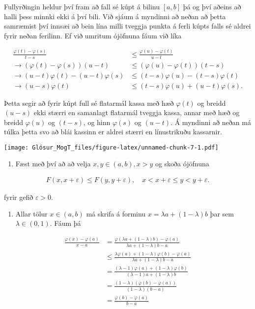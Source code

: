 \documentclass[]{book}
\providecommand{\tightlist}{%
  \setlength{\itemsep}{0pt}\setlength{\parskip}{0pt}}
\begin{document}
Fullyrðingin heldur því fram að fall sé kúpt á bilinu \([a,b]\) þá og því aðeins að halli þess minnki ekki á því bili. Við sjáum á myndinni að neðan að þetta samræmist því innsæi að bein lína milli tveggja punkta á ferli kúpts falls sé aldrei fyrir neðan ferilinn. Ef við umritum ójöfnuna fáum við líka

\[
\begin{aligned}
\frac{\varphi(t) - \varphi(s)}{t - s} &\leq \frac{\varphi(u) - \varphi(t)}{u - t} \\
\rightarrow (\varphi(t) - \varphi(s)) (u - t) &\leq (\varphi(u) - \varphi(t))(t - s) \\
\rightarrow (u - t)\varphi(t) - (u - t)\varphi(s) &\leq (t - s)\varphi(u) - (t - s)\varphi(t) \\
\rightarrow (u - s)\varphi(t)  &\leq (t - s)\varphi(u) + (u - t)\varphi(s).
\end{aligned}
\]

Þetta segir að fyrir kúpt full sé flatarmál kassa með hæð \(\varphi(t)\) og breidd \((u - s)\) ekki stærri en samanlagt flatarmál tveggja kassa, annar með hæð og breidd \(\varphi(u)\) og \((t - s)\), og hinn \(\varphi(s)\) og \((u - t)\). Á myndinni að neðan má túlka þetta svo að blái kassinn er aldrei stærri en línustrikuðu kassarnir.

\texttt{[image: Glósur\_MogT\_files/figure-latex/unnamed-chunk-7-1.pdf]}

\begin{enumerate}
\def\labelenumi{\arabic{enumi}.}
\setcounter{enumi}{1}
\tightlist
\item
  Fæst með því að að velja \(x,y\in(a,b), x>y\) og skoða ójöfnuna
\end{enumerate}

\[
\begin{aligned}
F(x, x+\varepsilon) \leq F(y, y+\varepsilon), \quad x < x + \varepsilon \leq y < y + \varepsilon.
\end{aligned}
\]

fyrir gefið \(\varepsilon > 0\).

\begin{enumerate}
\def\labelenumi{\arabic{enumi}.}
\setcounter{enumi}{2}
\tightlist
\item
  Allar tölur \(x\in(a,b)\) má skrifa á forminu \(x = \lambda a + (1 - \lambda)b\) þar sem \(\lambda\in(0,1)\). Fáum þá
\end{enumerate}

\[
\begin{aligned}
\frac{\varphi(x) - \varphi(a)}{x - a} &= \frac{\varphi(\lambda a + (1 - \lambda)b) - \varphi(a)}{\lambda a + (1 - \lambda)b - a} \\
&\leq \frac{\lambda \varphi(a) + (1 - \lambda)\varphi(b) - \varphi(a)}{\lambda a + (1 - \lambda)b - a} \\
&= \frac{(\lambda - 1) \varphi(a) + (1 - \lambda)\varphi(b)}{(\lambda - 1)a + (1 - \lambda)b} \\
&= \frac{(1 - \lambda)(\varphi(b) -\varphi(a))}{(1 - \lambda)(b - a)} \\
&= \frac{\varphi(b) - \varphi(a)}{b - a}
\end{aligned}
\]
\end{document}
